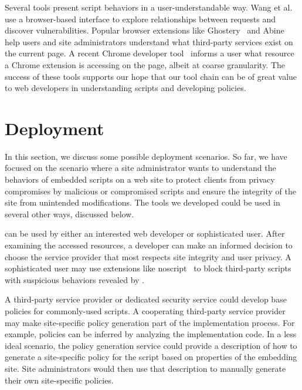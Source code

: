  Several tools present
script behaviors in a user-understandable way.  Wang et
al.~\cite{Wang:2012:SMY:2310656.2310691} use a browser-based interface
to explore relationships between requests and discover vulnerabilities.
Popular browser extensions like Ghostery~\cite{Ghostery} and
Abine~\cite{Abine} help users and site administrators understand what
third-party services exist on the current page.  A recent Chrome
developer tool~\cite{ChromeDeveloperTool} informs a user what resource a
Chrome extension is accessing on the page, albeit at coarse granularity.
The success of these tools supports our hope that our tool chain can be of
great value to web developers in understanding scripts and developing
policies.

\section{Deployment}\label{sec:stDeployment}

In this section, we discuss some possible deployment scenarios.  So far,
we have focused on the scenario where a site administrator wants to
understand the behaviors of embedded scripts on a web site to protect
clients from privacy compromises by malicious or compromised scripts and
ensure the integrity of the site from unintended modifications.  The
tools we developed could be used in several other ways, discussed below.

 \vis can be used by either an
interested web developer or sophisticated user.  After examining the
accessed resources, a developer can make an informed decision to choose
the service provider that most respects site integrity and user privacy.
A sophisticated user may use extensions like noscript~\cite{noscript} to
block third-party scripts with suspicious behaviors revealed by \vis.

 A third-party service provider
or dedicated security service could develop base policies for
commonly-used scripts.  A cooperating third-party service provider may
make site-specific policy generation part of the implementation process.
For example, policies can be inferred by analyzing the implementation
code.  In a less ideal scenario, the policy generation service could
provide a description of how to generate a site-specific policy for the
script based on properties of the embedding site.  Site administrators
would then use that description to manually generate their own
site-specific policies.

